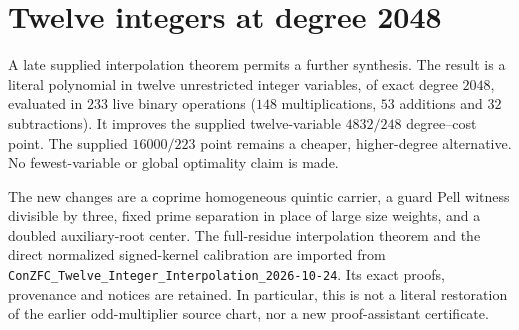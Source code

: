 \section{Twelve integers at degree 2048}
\label{sec:twelve2048}
A late supplied interpolation theorem permits a further synthesis. The
result is a literal polynomial in twelve unrestricted integer variables,
of exact degree $2048$, evaluated in $233$ live binary operations
($148$ multiplications, $53$ additions and $32$ subtractions).
It improves the supplied twelve-variable $4832/248$ degree--cost point.
The supplied $16000/223$ point remains a cheaper, higher-degree alternative.
No fewest-variable or global optimality claim is made.

The new changes are a coprime homogeneous quintic carrier, a guard Pell
witness divisible by three, fixed prime separation in place of large
size weights, and a doubled auxiliary-root center. The full-residue
interpolation theorem and the direct normalized signed-kernel calibration
are imported from \texttt{ConZFC\_Twelve\_Integer\_Interpolation\_2026-10-24}.
Its exact proofs, provenance and notices are retained. In particular,
this is not a literal restoration of the earlier odd-multiplier source
chart, nor a new proof-assistant certificate.

